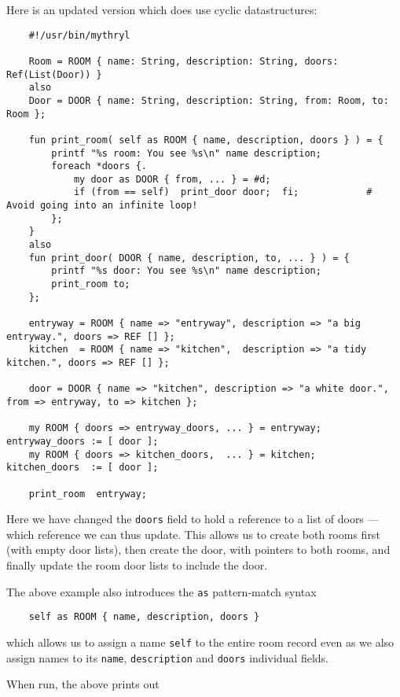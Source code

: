 Here is an updated version which does use cyclic datastructures:

\begin{verbatim}
    #!/usr/bin/mythryl

    Room = ROOM { name: String, description: String, doors: Ref(List(Door)) }
    also
    Door = DOOR { name: String, description: String, from: Room, to: Room };

    fun print_room( self as ROOM { name, description, doors } ) = {
        printf "%s room: You see %s\n" name description;
        foreach *doors {.
            my door as DOOR { from, ... } = #d;
            if (from == self)  print_door door;  fi;            # Avoid going into an infinite loop!
        };
    }
    also
    fun print_door( DOOR { name, description, to, ... } ) = {
        printf "%s door: You see %s\n" name description;
        print_room to;
    };

    entryway = ROOM { name => "entryway", description => "a big entryway.", doors => REF [] };
    kitchen  = ROOM { name => "kitchen",  description => "a tidy kitchen.", doors => REF [] };

    door = DOOR { name => "kitchen", description => "a white door.", from => entryway, to => kitchen };

    my ROOM { doors => entryway_doors, ... } = entryway;   entryway_doors := [ door ];
    my ROOM { doors => kitchen_doors,  ... } = kitchen;    kitchen_doors  := [ door ];

    print_room  entryway;
\end{verbatim}

Here we have changed the {\tt doors} field to hold a reference to a list of doors --- 
which reference we can thus update.  This allows us to create both rooms first (with empty door lists), 
then create the door, with pointers to both rooms, and finally update the room door lists to 
include the door.

The above example also introduces the {\tt as} pattern-match syntax

\begin{verbatim}
    self as ROOM { name, description, doors }
\end{verbatim}

which allows us to assign a name {\tt self} to the 
entire room record even as we also assign names to its {\tt name}, {\tt description} 
and {\tt doors} individual fields.

When run, the above prints out

